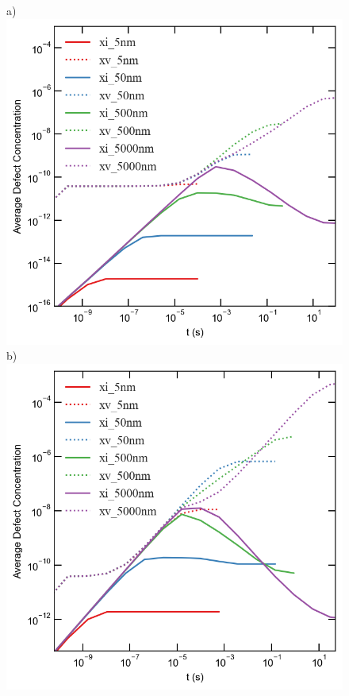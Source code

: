 \documentclass[utf8]{frontiersSCNS} %
\begin{document}
    \begin{figure}[h!]
        \centering
        a)\includegraphics[scale=0.55]{Fig2_a}
        \qquad
        b)\includegraphics[scale=0.55]{Fig2_b}

\end{figure}
\end{document}

